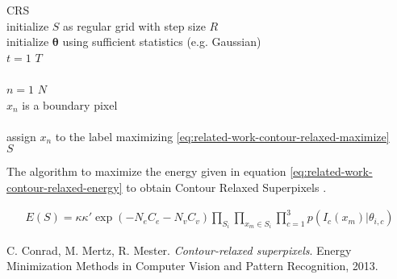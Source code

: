\documentclass[12pt,a4paper]{article}
\begin{document}
	\begin{algorithm}[t]
		\begin{algo}{CRS}{\label{algo:related-work-contour-relaxed}}
			\\
			initialize $S$ as regular grid with step size $R$\\
			initialize $\boldsymbol \theta$ using sufficient statistics (e.g. Gaussian)\\
			\qfor $t = 1$ \qto $T$\\
				\\
				\qfor $n = 1$ \qto $N$\\
				\qif $x_n$ is a boundary pixel\\
					\\
					\qthen assign $x_n$ to the label maximizing \eqref{eq:related-work-contour-relaxed-maximize}\qfi\qrof\qrof\\
			\qreturn $S$
		\end{algo}
		\caption{The algorithm to maximize the energy given in equation \eqref{eq:related-work-contour-relaxed-energy} to obtain Contour Relaxed Superpixels \cite{ConradMertzMester}.}
		\label{fig:related-work-contour-relaxed-algorithm}
	\end{algorithm}
	
	\begin{align}
		\label{eq:related-work-contour-relaxed-maximize}
		E(S) = \kappa \kappa' \exp(- N_{e} C_{e} - N_{v} C_{v}) \prod_{S_i} \prod_{x_m \in S_i} \prod_{c=1}^3 p(I_c(x_m) | \theta_{i,c})
	\end{align}
	
	\begin{thebibliography}{1}
		C. Conrad, M. Mertz, R. Mester.
		\emph{Contour-relaxed superpixels}.
		Energy Minimization Methods in Computer Vision and Pattern Recognition, 2013.
	\end{thebibliography}
\end{document}
